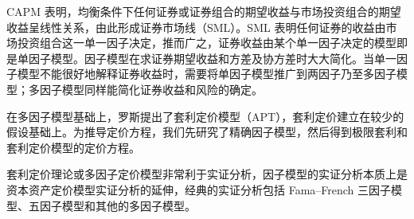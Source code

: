 

\begin{tcolorbox}[summary,title=本章小结]
CAPM 表明，均衡条件下任何证券或证券组合的期望收益与市场投资组合的期望收益呈线性关系，由此形成证券市场线（SML）。SML 表明任何证券的收益由市场投资组合这一单一因子决定，推而广之，证券收益由某个单一因子决定的模型即是单因子模型。因子模型在求证券期望收益和方差及协方差时大大简化。当单一因子模型不能很好地解释证券收益时，需要将单因子模型推广到两因子乃至多因子模型；多因子模型同样能简化证券收益和风险的确定。

在多因子模型基础上，罗斯提出了套利定价模型（APT），套利定价建立在较少的假设基础上。为推导定价方程，我们先研究了精确因子模型，然后得到极限套利和套利定价模型的定价方程。

套利定价理论或多因子定价模型非常利于实证分析，因子模型的实证分析本质上是资本资产定价模型实证分析的延伸，经典的实证分析包括 Fama--French 三因子模型、五因子模型和其他的多因子模型。
\end{tcolorbox}



